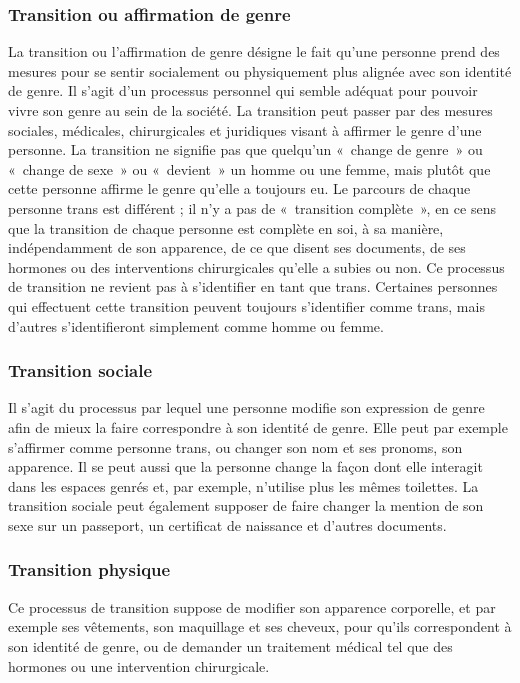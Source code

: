 \documentclass[12pt,openany]{book}
\begin{document}
\subsubsection*{Transition ou affirmation de genre}

\noindent La transition ou l’affirmation de genre désigne le fait qu’une personne prend des mesures pour se sentir socialement ou physiquement plus alignée avec son identité de genre. Il s’agit d’un processus personnel qui semble adéquat pour pouvoir vivre son genre au sein de la société. La transition peut passer par des mesures sociales, médicales, chirurgicales et juridiques visant à affirmer le genre d’une personne. La transition ne signifie pas que quelqu’un \mbox{« c}hange de genr\mbox{e »} ou \mbox{« c}hange de sex\mbox{e »} ou \mbox{« devient »} un homme ou une femme, mais plutôt que cette personne affirme le genre qu’elle a toujours eu. Le parcours de chaque personne trans est différent ; il n’y a pas de \mbox{« t}ransition complèt\mbox{e »}, en ce sens que la transition de chaque personne est complète en soi, à sa manière, indépendamment de son apparence, de ce que disent ses documents, de ses hormones ou des interventions chirurgicales qu’elle a subies ou non. Ce processus de transition ne revient pas à s’identifier en tant que trans. Certaines personnes qui effectuent cette transition peuvent toujours s’identifier comme trans, mais d’autres s’identifieront simplement comme homme ou femme.

\subsubsection*{Transition sociale}

\noindent Il s’agit du processus par lequel une personne modifie son expression de genre afin de mieux la faire correspondre à son identité de genre. Elle peut par exemple s’affirmer comme personne trans, ou changer son nom et ses pronoms, son apparence. Il se peut aussi que la personne change la façon dont elle interagit dans les espaces genrés et, par exemple, n’utilise plus les mêmes toilettes. La transition sociale peut également supposer de faire changer la mention de son sexe sur un passeport, un certificat de naissance et d’autres documents.

\subsubsection*{Transition physique}

\noindent Ce processus de transition suppose de modifier son apparence corporelle, et par exemple ses vêtements, son maquillage et ses cheveux, pour qu’ils correspondent à son identité de genre, ou de demander un traitement médical tel que des hormones ou une intervention chirurgicale.
\end{document}
